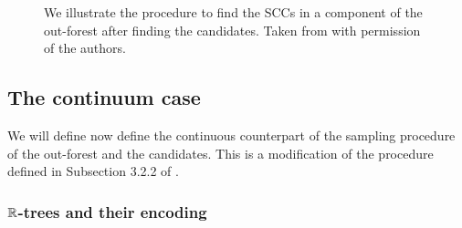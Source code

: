 \begin{figure}
\caption{We illustrate the procedure to find the SCCs in a component of the out-forest after finding the candidates. Taken from \cite{goldschmidtScalingLimitCritical2021} with permission of the authors.}
\end{figure}

\subsection{The continuum case}\label{subsec.limitobject}

We will define now define the continuous counterpart of the sampling procedure of the out-forest and the candidates. This is a modification of the procedure defined in Subsection 3.2.2 of \cite{goldschmidtScalingLimitCritical2021}.

\subsubsection{\texorpdfstring{${\mathbb R}$}{R}-trees and their encoding}


